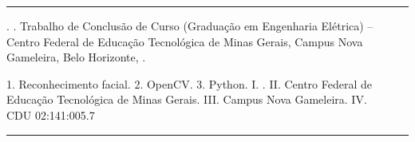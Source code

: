 \begin{fichacatalografica}
    \vspace*{\fill}					%
    \hrule							%
    \begin{center}					%
    \begin{minipage}[c]{12.5cm}		%
    
    \imprimirtitulo. \imprimirdata. Trabalho de Conclusão de Curso (Graduação em Engenharia Elétrica) -- Centro Federal de Educação Tecnológica de Minas Gerais, Campus Nova Gameleira, Belo Horizonte, \imprimirdata.
    
    \hspace{0.5cm} 1. Reconhecimento facial.
    \hspace{0.5cm} 2. OpenCV.
    \hspace{0.5cm} 3. Python.
    \hspace{0.5cm} I. \imprimirorientador.
    \hspace{0.5cm} II. Centro Federal de Educação Tecnológica de Minas Gerais.
    \hspace{0.5cm} III. Campus Nova Gameleira.
    \hspace{0.5cm} IV. \imprimirtitulo\\ 			
    
    \hspace{8.75cm} CDU 02:141:005.7\\
    
    \end{minipage}
    \end{center}
    \hrule
\end{fichacatalografica}

